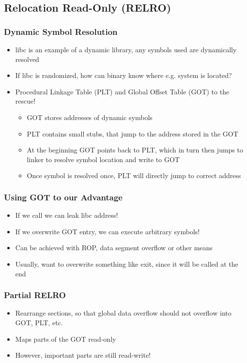 \documentclass[aspectratio=169]{beamer}
\begin{document}
{\subsection{Relocation Read-Only (RELRO)}

\begin{frame}
    \frametitle{Dynamic Symbol Resolution}
    \begin{itemize}
        \item libc is an example of a dynamic library, any symbols used are dynamically resolved
        \item If libc is randomized, how can binary know where e.g. system is located?
        \item Procedural Linkage Table (PLT) and Global Offset Table (GOT) to the rescue!
        \begin{itemize}
            \item GOT stores addresses of dynamic symbols
            \item PLT contains small stubs, that jump to the address stored in the GOT
            \item At the beginning GOT points back to PLT, which in turn then jumps to linker to resolve symbol location and write to GOT
            \item Once symbol is resolved once, PLT will directly jump to correct address
        \end{itemize}
    \end{itemize}
\end{frame}

\begin{frame}[fragile]
    \frametitle{Using GOT to our Advantage}
    \begin{itemize}
        \item If we call  we can leak libc address!
        \item If we overwrite GOT entry, we can execute arbitrary symbols!
        \item Can be achieved with ROP, data segment overflow or other means
        \item Usually, want to overwrite something like exit, since it will be called at the end
    \end{itemize}

\end{frame}

\begin{frame}
    \frametitle{Partial RELRO}
    \begin{itemize}
        \item Rearrange sections, so that global data overflow should not overflow into GOT, PLT, etc.
        \item Maps parts of the GOT read-only
        \item However, important parts are still read-write!
    \end{itemize}
\end{frame}

}
\end{document}
